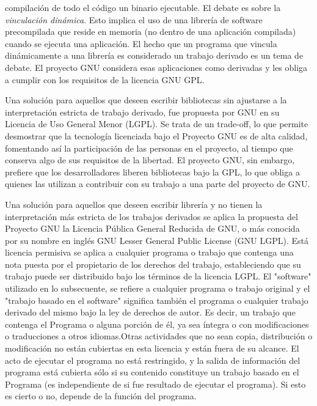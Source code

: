 	compilación de todo el código un binario ejecutable. El debate es sobre la \textit{vinculación dinámica}. Esto implica el uso de una librería de
	software precompilada que reside en memoria (no dentro de una aplicación compilada) cuando se ejecuta una aplicación. El hecho que un programa que 
	vincula dinámicamente a una librería es considerado un trabajo derivado es un tema de debate. El proyecto GNU considera esas aplicaciones como
	derivadas y les obliga a cumplir con los requisitos de la licencia GNU GPL.
	\vspace{0.5cm}
	\par	
 	Una solución para aquellos que deseen escribir bibliotecas sin ajustarse a la interpretación estricta de trabajo derivado, fue
 	propuesta por GNU en su Licencia de Uso General Menor (LGPL). Se trata de un trade-off, lo que permite desmostrar que la tecnología licenciada bajo
 	el Proyecto GNU es de alta calidad, fomentando así la participación de las personas en el proyecto, al tiempo que conserva algo de sus requisitos
 	de la libertad. El proyecto GNU, sin embargo, prefiere que los desarrolladores liberen bibliotecas bajo la GPL, lo que obliga a quienes las
 	utilizan a contribuir con su trabajo a una parte del proyecto de GNU.
	
	

	
	\vspace{0.5cm}
	\par	
	Una solución para aquellos que deseen escribir librería y no tienen la interpretación más estricta de los trabajos derivados se aplica la propuesta
 	del Proyecto GNU la Licencia Pública General Reducida de GNU, o más conocida por su nombre en inglés GNU Lesser General Public License (GNU LGPL). Está
 	licencia permisiva se aplica a cualquier programa o trabajo que contenga una nota puesta por el propietario de los derechos del trabajo,
 	estableciendo que su trabajo puede ser distribuido bajo los términos de la licencia LGPL. El "software" utilizado en lo subsecuente, se refiere a cualquier programa o trabajo original y el "trabajo basado en el software" significa también el programa o cualquier trabajo derivado del mismo bajo la ley de derechos de autor. Es decir, un trabajo que contenga el Programa o alguna porción de él, ya sea íntegra o con modificaciones o traducciones a otros idiomas.Otras actividades que no sean copia, distribución o modificación no están cubiertas en esta licencia y están fuera de su alcance. El acto de ejecutar el programa no está restringido, y la salida de información del programa está cubierta sólo si su contenido constituye un trabajo basado en el Programa (es independiente de si fue resultado de ejecutar el programa). Si esto es cierto o no, depende de la función del programa.\cite{Etiqueta03} 


